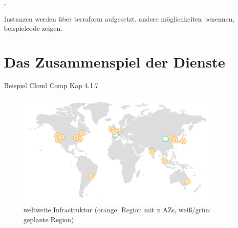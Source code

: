 \cite{aws:elb}, \cite{aws:alb}


Instanzen werden über terraform aufgesetzt. andere möglichkeiten benennen, beispielcode zeigen.

\section{Das Zusammenspiel der Dienste}
\label{sec:spiel}
Beispiel Cloud Comp Kap 4.1.7

\begin{figure}[!ht]
  \centering
  \includegraphics[width=0.9\textwidth]{images/regions.png}
  \caption{weltweite Infrastruktur (orange: Region mit x AZs, weiß/grün: geplante Region) \cite{aws:regions}}
\end{figure}


